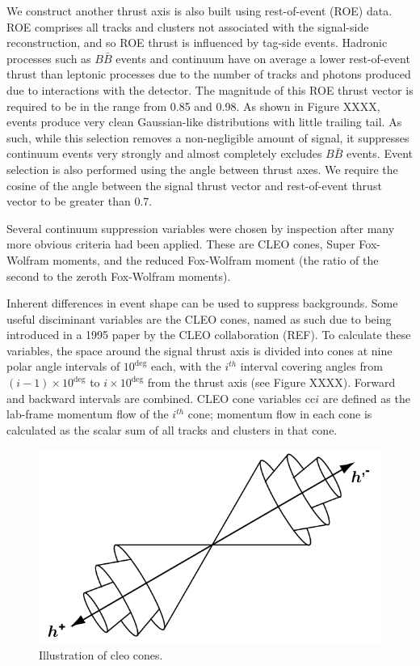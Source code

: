 \documentclass[12pt]{thesis}  %
\begin{document}
We construct another thrust axis is also built using rest-of-event (ROE) data. ROE comprises all tracks and clusters not associated with the signal-side reconstruction, and so ROE thrust is influenced by tag-side events. Hadronic processes such as $B\bar{B}$ events and continuum have on average a lower rest-of-event thrust than leptonic processes due to the number of tracks and photons produced due to interactions with the detector. The magnitude of this ROE thrust vector is required to be in the range from \num{0.85} and \num{0.98}. As shown in Figure XXXX, events produce very clean Gaussian-like distributions with little trailing tail. As such, while this selection removes a non-negligible amount of signal, it suppresses continuum events very strongly and almost completely excludes $B\bar{B}$ events. Event selection is also performed using the angle between thrust axes. We require the cosine of the angle between the signal thrust vector and rest-of-event thrust vector to be greater than \num{0.7}.


Several continuum suppression variables were chosen by inspection after many more obvious criteria had been applied. These are CLEO cones, Super Fox-Wolfram moments, and the reduced Fox-Wolfram moment (the ratio of the second to the zeroth Fox-Wolfram moments).

Inherent differences in event shape can be used to suppress backgrounds. Some useful disciminant variables are the CLEO cones, named as such due to being introduced in a 1995 paper by the CLEO collaboration (REF). To calculate these variables, the space around the signal thrust axis is divided into cones at nine polar angle intervals of $10^{\deg}$ each, with the $i^{th}$ interval covering angles from $(i-1)\times 10^{\deg}$ to $i\times 10^{\deg}$ from the thrust axis (see Figure XXXX). Forward and backward intervals are combined. CLEO cone variables cc$i$ are defined as the lab-frame momentum flow of the $i^{th}$ cone; momentum flow in each cone is calculated as the scalar sum of all tracks and clusters in that cone.

\begin{figure}[h]
\centering
\includegraphics[width=0.5\linewidth]{images/cleo-cone.png}
\caption{Illustration of cleo cones.}
\label{}
\end{figure}
\end{document}

